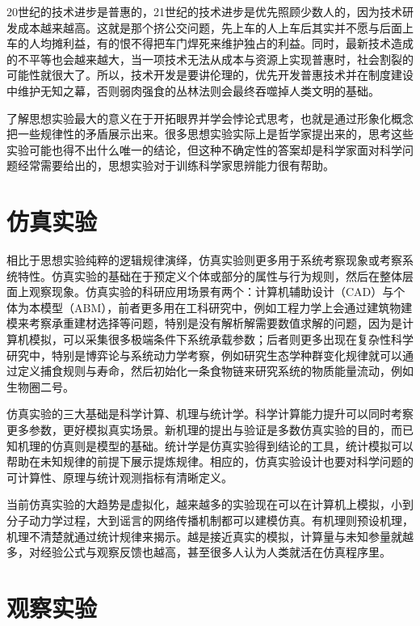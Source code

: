 \documentclass[]{tufte-book}
\begin{document}
20世纪的技术进步是普惠的，21世纪的技术进步是优先照顾少数人的，因为技术研发成本越来越高。这就是那个挤公交问题，先上车的人上车后其实并不愿与后面上车的人均摊利益，有的恨不得把车门焊死来维护独占的利益。同时，最新技术造成的不平等也会越来越大，当一项技术无法从成本与资源上实现普惠时，社会割裂的可能性就很大了。所以，技术开发是要讲伦理的，优先开发普惠技术并在制度建设中维护无知之幕，否则弱肉强食的丛林法则会最终吞噬掉人类文明的基础。

了解思想实验最大的意义在于开拓眼界并学会悖论式思考，也就是通过形象化概念把一些规律性的矛盾展示出来。很多思想实验实际上是哲学家提出来的，思考这些实验可能也得不出什么唯一的结论，但这种不确定性的答案却是科学家面对科学问题经常需要给出的，思想实验对于训练科学家思辨能力很有帮助。

\hypertarget{ux4effux771fux5b9eux9a8c}{%
\section{仿真实验}\label{ux4effux771fux5b9eux9a8c}}

相比于思想实验纯粹的逻辑规律演绎，仿真实验则更多用于系统考察现象或考察系统特性。仿真实验的基础在于预定义个体或部分的属性与行为规则，然后在整体层面上观察现象。仿真实验的科研应用场景有两个：计算机辅助设计（CAD）与个体为本模型（ABM），前者更多用在工科研究中，例如工程力学上会通过建筑物建模来考察承重建材选择等问题，特别是没有解析解需要数值求解的问题，因为是计算机模拟，可以采集很多极端条件下系统承载参数；后者则更多出现在复杂性科学研究中，特别是博弈论与系统动力学考察，例如研究生态学种群变化规律就可以通过定义捕食规则与寿命，然后初始化一条食物链来研究系统的物质能量流动，例如生物圈二号。

仿真实验的三大基础是科学计算、机理与统计学。科学计算能力提升可以同时考察更多参数，更好模拟真实场景。新机理的提出与验证是多数仿真实验的目的，而已知机理的仿真则是模型的基础。统计学是仿真实验得到结论的工具，统计模拟可以帮助在未知规律的前提下展示提炼规律。相应的，仿真实验设计也要对科学问题的可计算性、原理与统计观测指标有清晰定义。

当前仿真实验的大趋势是虚拟化，越来越多的实验现在可以在计算机上模拟，小到分子动力学过程，大到谣言的网络传播机制都可以建模仿真。有机理则预设机理，机理不清楚就通过统计规律来揭示。越是接近真实的模拟，计算量与未知参量就越多，对经验公式与观察反馈也越高，甚至很多人认为人类就活在仿真程序里。

\hypertarget{ux89c2ux5bdfux5b9eux9a8c}{%
\section{观察实验}\label{ux89c2ux5bdfux5b9eux9a8c}}
\end{document}
